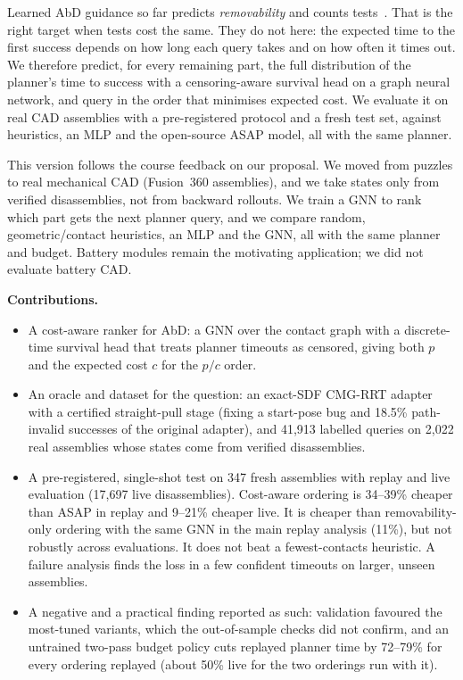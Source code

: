 \documentclass[conference]{IEEEtran}
\begin{document}
Learned AbD guidance so far predicts \emph{removability} and counts tests~\cite{cebulla2023,tian2024asap}. That is the
right target when tests cost the same. They do not here: the expected time to the first success depends on how
long each query takes and on how often it times out. We therefore predict, for every remaining part, the full
distribution of the planner's time to success with a censoring-aware survival head on a graph neural network, and
query in the order that minimises expected cost. We evaluate it on real CAD assemblies with a pre-registered protocol
and a fresh test set, against heuristics, an MLP and the open-source ASAP model, all with the same planner.

This version follows the course feedback on our proposal. We moved from puzzles to real mechanical CAD
(Fusion~360 assemblies), and we take states only from verified disassemblies, not from backward rollouts. We train a
GNN to rank which part gets the next planner query, and we compare random, geometric/contact heuristics, an MLP and
the GNN, all with the same planner and budget. Battery modules remain the motivating application; we did not evaluate
battery CAD.

\noindent\textbf{Contributions.}
\begin{itemize}
\item A cost-aware ranker for AbD: a GNN over the contact graph with a discrete-time survival head that treats planner
timeouts as censored, giving both $p$ and the expected cost $c$ for the $p/c$ order.
\item An oracle and dataset for the question: an exact-SDF CMG-RRT adapter with a certified straight-pull stage (fixing a
start-pose bug and 18.5\% path-invalid successes of the original adapter), and 41{,}913 labelled queries on 2{,}022 real
assemblies whose states come from verified disassemblies.
\item A pre-registered, single-shot test on 347 fresh assemblies with replay and live evaluation (17{,}697 live
disassemblies). Cost-aware ordering is 34--39\% cheaper than ASAP in replay and 9--21\% cheaper live. It is cheaper than
removability-only ordering with the same GNN in the main replay analysis (11\%), but not robustly across evaluations.
It does not beat a fewest-contacts heuristic. A failure analysis finds the loss in a few confident timeouts on larger,
unseen assemblies.
\item A negative and a practical finding reported as such: validation favoured the most-tuned variants, which the
out-of-sample checks did not confirm, and an untrained two-pass budget policy cuts replayed planner time by 72--79\% for every ordering replayed
(about 50\% live for the two orderings run with it).
\end{itemize}
\end{document}
